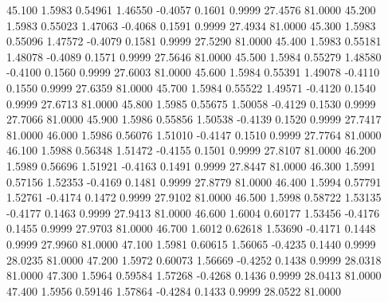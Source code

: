   45.100   1.5983   0.54961   1.46550  -0.4057   0.1601   0.9999  27.4576  81.0000
  45.200   1.5983   0.55023   1.47063  -0.4068   0.1591   0.9999  27.4934  81.0000
  45.300   1.5983   0.55096   1.47572  -0.4079   0.1581   0.9999  27.5290  81.0000
  45.400   1.5983   0.55181   1.48078  -0.4089   0.1571   0.9999  27.5646  81.0000
  45.500   1.5984   0.55279   1.48580  -0.4100   0.1560   0.9999  27.6003  81.0000
  45.600   1.5984   0.55391   1.49078  -0.4110   0.1550   0.9999  27.6359  81.0000
  45.700   1.5984   0.55522   1.49571  -0.4120   0.1540   0.9999  27.6713  81.0000
  45.800   1.5985   0.55675   1.50058  -0.4129   0.1530   0.9999  27.7066  81.0000
  45.900   1.5986   0.55856   1.50538  -0.4139   0.1520   0.9999  27.7417  81.0000
  46.000   1.5986   0.56076   1.51010  -0.4147   0.1510   0.9999  27.7764  81.0000
  46.100   1.5988   0.56348   1.51472  -0.4155   0.1501   0.9999  27.8107  81.0000
  46.200   1.5989   0.56696   1.51921  -0.4163   0.1491   0.9999  27.8447  81.0000
  46.300   1.5991   0.57156   1.52353  -0.4169   0.1481   0.9999  27.8779  81.0000
  46.400   1.5994   0.57791   1.52761  -0.4174   0.1472   0.9999  27.9102  81.0000
  46.500   1.5998   0.58722   1.53135  -0.4177   0.1463   0.9999  27.9413  81.0000
  46.600   1.6004   0.60177   1.53456  -0.4176   0.1455   0.9999  27.9703  81.0000
  46.700   1.6012   0.62618   1.53690  -0.4171   0.1448   0.9999  27.9960  81.0000
  47.100   1.5981   0.60615   1.56065  -0.4235   0.1440   0.9999  28.0235  81.0000
  47.200   1.5972   0.60073   1.56669  -0.4252   0.1438   0.9999  28.0318  81.0000
  47.300   1.5964   0.59584   1.57268  -0.4268   0.1436   0.9999  28.0413  81.0000
  47.400   1.5956   0.59146   1.57864  -0.4284   0.1433   0.9999  28.0522  81.0000
